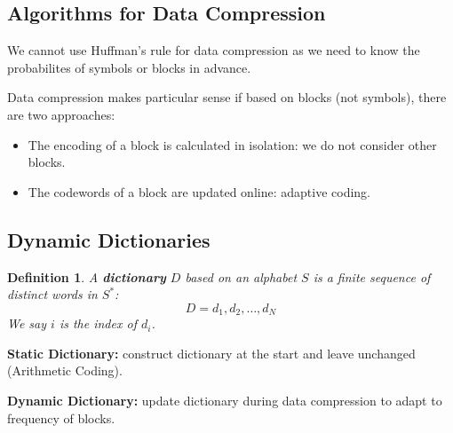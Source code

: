 \documentclass[11pt]{article}
\newtheorem{defn}{Definition}
\begin{document}
\subsection{Algorithms for Data Compression}
We cannot use Huffman's rule for data compression as we need to know the probabilites of symbols or blocks in advance.

Data compression makes particular sense if based on blocks (not symbols), there are two approaches:
\begin{itemize}
  \item The encoding of a block is calculated in isolation: we do not consider other blocks.
  \item The codewords of a block are updated online: adaptive coding.
\end{itemize}

\subsection{Dynamic Dictionaries}
\begin{defn}
  A \textbf{dictionary} $D$ based on an alphabet $S$ is a finite sequence of distinct words in $S^*$:
  \[
    D = d_1, d_2, \ldots, d_N
  \]
  We say $i$ is the index of $d_i$.
\end{defn}

\textbf{Static Dictionary:} construct dictionary at the start and leave unchanged (Arithmetic Coding).

\textbf{Dynamic Dictionary:} update dictionary during data compression to adapt to frequency of blocks.
\end{document}
